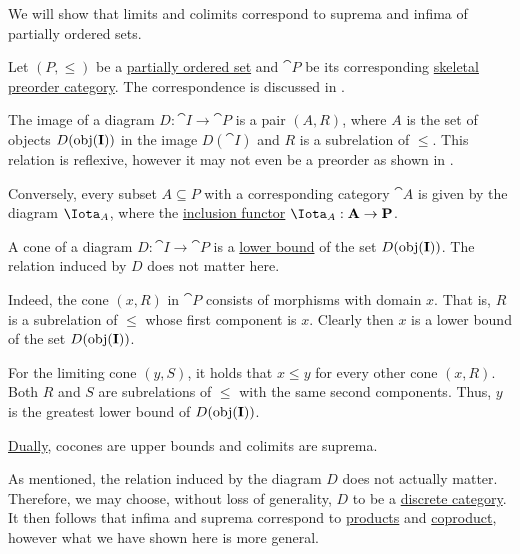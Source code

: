 \begin{example}\label{ex:limits_of_partially_ordered_set}
  We will show that limits and colimits correspond to suprema and infima of partially ordered sets.

  Let \( (P, \leq) \) be a \hyperref[def:partially_ordered_set]{partially ordered set} and \( \cat{P} \) be its corresponding \hyperref[def:skeletal_category]{skeletal} \hyperref[def:preorder_category]{preorder category}. The correspondence is discussed in .

  The image of a diagram \( D: \cat{I} \to \cat{P} \) is a pair \( (A, R) \), where \( A \) is the set of objects \( D(\obj(\cat{I})) \) in the image \( D(\cat{I}) \) and \( R \) is a subrelation of \( \leq \). This relation is reflexive, however it may not even be a preorder as shown in .

  Conversely, every subset \( A \subseteq P \) with a corresponding category \( \cat{A} \) is given by the diagram \( \Iota_A \), where the \hyperref[def:subcategory]{inclusion functor} \( \Iota_A: \cat{A} \to \cat{P} \).

  A cone of a diagram \( D: \cat{I} \to \cat{P} \) is a \hyperref[def:extremal_points/bounds]{lower bound} of the set \( D(\obj(\cat{I})) \). The relation induced by \( D \) does not matter here.

  Indeed, the cone \( (x, R) \) in \( \cat{P} \) consists of morphisms with domain \( x \). That is, \( R \) is a subrelation of \( \leq \) whose first component is \( x \). Clearly then \( x \) is a lower bound of the set \( D(\obj(\cat{I})) \).

  For the limiting cone \( (y, S) \), it holds that \( x \leq y \) for every other cone \( (x, R) \). Both \( R \) and \( S \) are subrelations of \( \leq \) with the same second components. Thus, \( y \) is the greatest lower bound of \( D(\obj(\cat{I})) \).

  \hyperref[thm:categorical_principle_of_duality]{Dually}, cocones are upper bounds and colimits are suprema.

  As mentioned, the relation induced by the diagram \( D \) does not actually matter. Therefore, we may choose, without loss of generality, \( D \) to be a \hyperref[def:discrete_category]{discrete category}. It then follows that infima and suprema correspond to \hyperref[def:discrete_category_limits]{products} and \hyperref[def:discrete_category_limits]{coproduct}, however what we have shown here is more general.
\end{example}

